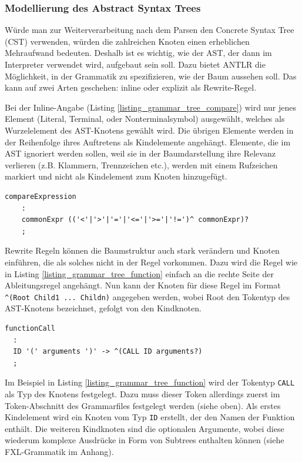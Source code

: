 \subsubsection{Modellierung des Abstract Syntax Trees}

Würde man zur Weiterverarbeitung nach dem Parsen den Concrete Syntax Tree (CST) verwenden, würden die zahlreichen Knoten einen erheblichen Mehraufwand bedeuten. Deshalb ist es wichtig, wie der AST, der dann im Interpreter verwendet wird, aufgebaut sein soll. Dazu bietet ANTLR die Möglichkeit, in der Grammatik zu spezifizieren, wie der Baum aussehen soll. Das kann auf zwei Arten geschehen: inline oder explizit als Rewrite-Regel.

Bei der Inline-Angabe (Listing \ref{listing_grammar_tree_compare}) wird nur jenes Element (Literal, Terminal, oder Nonterminalsymbol) ausgewählt, welches als Wurzelelement des AST-Knotens gewählt wird. Die übrigen Elemente werden in der Reihenfolge ihres Auftretens als Kindelemente angehängt. Elemente, die im AST ignoriert werden sollen, weil sie in der Baumdarstellung ihre Relevanz verlieren (z.B. Klammern, Trennzeichen etc.), werden mit einem Rufzeichen markiert und nicht als Kindelement zum Knoten hinzugefügt.


\begin{lstlisting}[float = htbp,caption={Inline-Regeln zur Beschreibung der Baumstruktur.},label=listing_grammar_tree_compare]
compareExpression
  	:
  	commonExpr (('<'|'>'|'='|'<='|'>='|'!=')^ commonExpr)?
  	;

\end{lstlisting}

Rewrite Regeln können die Baumstruktur auch stark verändern und Knoten einführen, die als solches nicht in der Regel vorkommen. Dazu wird die Regel wie in Listing \ref{listing_grammar_tree_function} einfach an die rechte Seite der Ableitungsregel angehängt. Nun kann der Knoten für diese Regel im Format \texttt{\textasciicircum(Root Child1 ... Childn)} angegeben werden, wobei Root den Tokentyp des AST-Knotens bezeichnet, gefolgt von den Kindknoten. 


\begin{lstlisting}[float = htbp,caption={Rewrite-Regeln zur Beschreibung der Baumstruktur.},label=listing_grammar_tree_function]
functionCall
  :
  ID '(' arguments ')' -> ^(CALL ID arguments?)
  ;
\end{lstlisting}

Im Beispiel in Listing \ref{listing_grammar_tree_function} wird der Tokentyp \texttt{CALL} als Typ des Knotens festgelegt. Dazu muss dieser Token allerdings zuerst im Token-Abschnitt des Grammarfiles festgelegt werden (siehe oben). Als erstes Kindelement wird ein Knoten vom Typ \texttt{ID} erstellt, der den Namen der Funktion enthält. Die weiteren Kindknoten sind die optionalen Argumente, wobei diese wiederum komplexe Ausdrücke in Form von Subtrees enthalten können (siehe FXL-Grammatik im Anhang).

